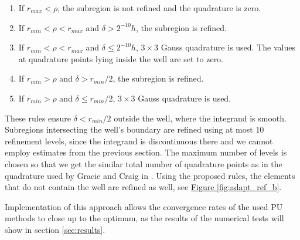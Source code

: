 \documentclass{elsarticle}
\newcommand{\fig}[1]{\hyperref[#1]{Figure \ref{#1}}}
\newcommand{\notePE}[1]{{\color{Orange} \textbf{PE: } \textit{#1}}}
\begin{document}
\begin{enumerate}
 \item If $r_{max} < \rho$, the subregion is not refined and the quadrature is zero.
 \item If $r_{min} < \rho < r_{max}$ and $\delta > 2^{-10}h$, the subregion is refined.
 \item If $r_{min} < \rho < r_{max}$ and $\delta \le 2^{-10}h$, $3\times3$ Gauss quadrature is used.
 The values at quadrature points lying inside the well are set to zero.
 \item If $r_{min} > \rho$ and $\delta > r_{min} / 2$, the subregion is refined.
 \item If $r_{min} > \rho$ and $\delta \le r_{min} / 2$, $3\times3$ Gauss quadrature is used.
\end{enumerate}


These rules ensure $\delta < r_{min}/2$ outside the well, where the integrand is smooth. Subregions intersecting 
the well's boundary are refined using at most $10$ refinement levels, since the integrand is discontinuous there and we cannot employ 
estimates from the previous section. The maximum number of levels is chosen so that we get the similar total number of quadrature points 
as in the quadrature used by Gracie and Craig in \cite{gracie_modelling_2010}. Using the proposed rules, the elements that do not contain the well are refined as well,
see \fig{fig:adapt_ref_b}. 

Implementation of this approach allows the convergence rates of the used PU methods to close up to the optimum,
as the results of the numerical tests will show in section \ref{sec:results}.


% 
% 
\end{document}
